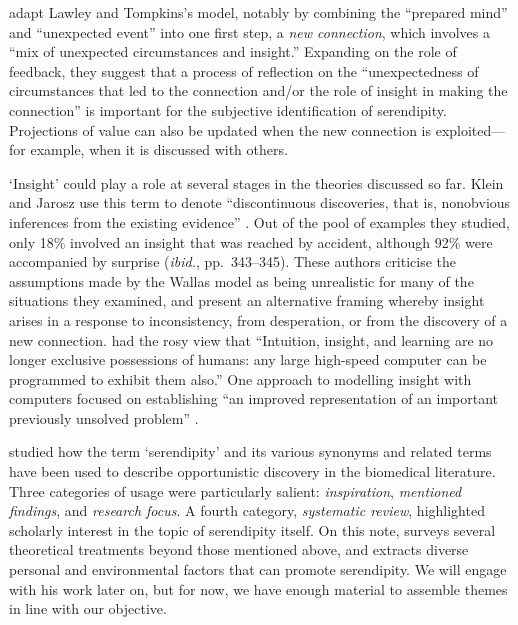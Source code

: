  adapt Lawley and Tompkins's model, notably by
combining the ``prepared mind'' and ``unexpected event'' into one
first step, a \emph{new connection}, which involves a ``mix of
unexpected circumstances and insight.''  Expanding on the role of
feedback, they suggest that a process of reflection on the
``unexpectedness of circumstances that led to the connection and/or
the role of insight in making the connection'' is important for the
subjective identification of serendipity.  Projections of value can
also be updated when the new connection is exploited---for example,
when it is discussed with others.

`Insight' could play a role at several stages in the theories
discussed so far.  Klein and Jarosz use this term to denote
``discontinuous discoveries, that is, nonobvious inferences from the
existing evidence'' \cite[p.~335]{Klein2011}.  Out of the pool of
examples they studied, only 18\% involved an insight that was reached
by accident, although 92\% were accompanied by surprise (\emph{ibid.},
pp.~343--345).  These authors criticise the assumptions made by the
Wallas model as being unrealistic for many of the situations they
examined, and present an alternative framing whereby insight arises in
a response to inconsistency, from desperation, or from the discovery
of a new connection.  \citet[p.~6]{simon1958heuristic} had the rosy
view that ``Intuition, insight, and learning are no longer exclusive
possessions of humans: any large high-speed computer can be programmed
to exhibit them also.''  One approach to modelling insight with
computers focused on establishing ``an improved representation of an
important previously unsolved problem''
\cite[p.~118]{demystification}.

\citet{Allen:2013:LOD:2655780.2655790} studied how the term
`serendipity' and its various synonyms and related terms have been
used to describe opportunistic discovery in the biomedical literature.
Three categories of usage were particularly salient:
\emph{inspiration}, \emph{mentioned findings}, and \emph{research
  focus}.  A fourth category, \emph{systematic review}, highlighted
scholarly interest in the topic of serendipity itself.
On this note, \citet{bjorneborn2017three} surveys several theoretical
treatments beyond those mentioned above, and extracts diverse personal
and environmental factors that can promote serendipity.  We will
engage with his work later on, but for now, we have enough material to
assemble themes in line with our objective.


